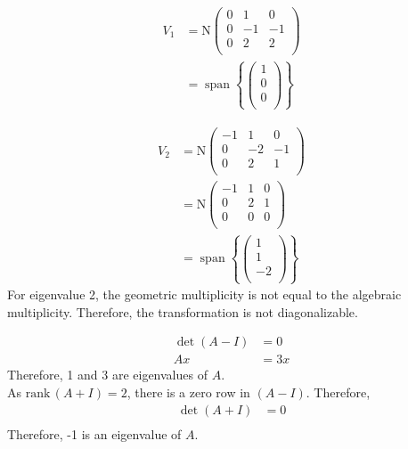 \documentclass[fleqn, a4paper, draft]{amsart}
\makeatletter
\def\section{\@startsection{section}{1}%
	\z@{.7\linespacing\@plus\linespacing}{.5\linespacing}%
	{\normalfont\scshape}}%
\DeclareMathOperator{\vspan}{\mathrm{span}} %
\theoremstyle{definition}
\theoremstyle{theorem}
\theoremstyle{remark}
\newcommand{\N}{\mathrm{N}}
\numberwithin{corollary}{theorem}
\numberwithin{equation}{theorem}
\makeatother
\begin{document}
\begin{align*}
	V_1 &= \N
		\begin{pmatrix}
			0 & 1 & 0\\
			0 & -1 & -1\\
			0 & 2 & 2\\
		\end{pmatrix}\\
	&= \vspan
		\left\lbrace
			\begin{pmatrix}
				1\\
				0\\
				0\\
			\end{pmatrix}
		\right\rbrace
\end{align*}

\begin{align*}
	V_2 &= \N
		\begin{pmatrix}
			-1 & 1 & 0\\
			0 & -2 & -1\\
			0 & 2 & 1\\
		\end{pmatrix}\\
	&= \N
		\begin{pmatrix}
			-1 & 1 & 0\\
			0 & 2 & 1\\
			0 & 0 & 0\\
		\end{pmatrix}\\
	&= \vspan
		\left\lbrace
			\begin{pmatrix}
				1\\
				1\\
				-2\\
			\end{pmatrix}
		\right\rbrace
\end{align*}
For eigenvalue 2, the geometric multiplicity is not equal to the algebraic multiplicity. Therefore, the transformation is not diagonalizable.

\section{}

\begin{align*}
	\det(A - I) &= 0\\
	A x &= 3 x
\end{align*}
Therefore, 1 and 3 are eigenvalues of $A$.\\
As $\mathrm{rank\,}(A + I) = 2$, there is a zero row in $(A - I)$. Therefore,
\begin{align*}
	\det(A + I) &= 0\\
\end{align*}
Therefore, -1 is an eigenvalue of $A$.
\end{document}
